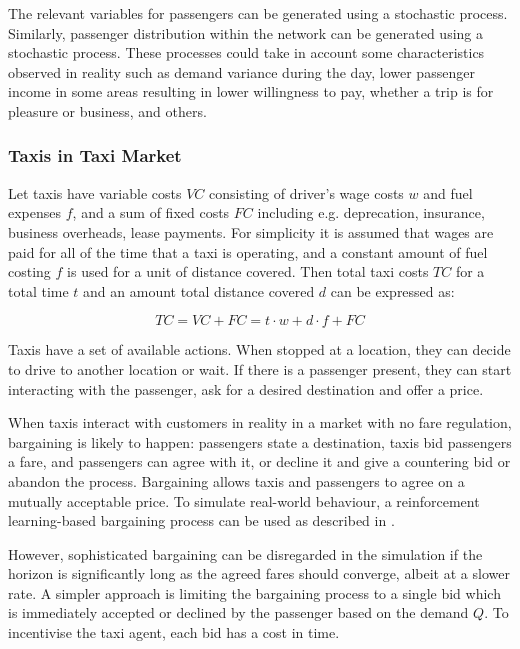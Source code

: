 The relevant variables for passengers can be generated using a stochastic
process. Similarly, passenger distribution within the network can be generated
using a stochastic process. These processes could take in account some
characteristics observed in reality such as demand variance during the day,
lower passenger income in some areas resulting in lower willingness to pay,
whether a trip is for pleasure or business, and others.


\subsubsection{Taxis in Taxi Market}
\label{sec:design:taxi}

Let taxis have variable costs \(VC\) consisting of driver's wage costs \(w\)
and fuel expenses \(f\), and a sum of fixed costs \(FC\) including e.g.
deprecation, insurance, business overheads, lease payments. For simplicity it
is assumed that wages are paid for all of the time that a taxi is operating,
and a constant amount of fuel costing \(f\) is used for a unit of distance
covered. Then total taxi costs \(TC\) for a total time \(t\) and an amount
total distance covered \(d\) can be expressed as:

\[ TC = VC + FC = t \cdot w + d \cdot f + FC \]

Taxis have a set of available actions. When stopped at a location, they can
decide to drive to another location or wait. If there is a passenger present,
they can start interacting with the passenger, ask for a desired destination
and offer a price.

When taxis interact with customers in reality in a market with no fare
regulation, bargaining is likely to happen: passengers state a destination,
taxis bid passengers a fare, and passengers can agree with it, or decline it
and give a countering bid or abandon the process. Bargaining allows taxis and
passengers to agree on a mutually acceptable price. To simulate real-world
behaviour, a reinforcement learning-based bargaining process can be used as
described in \textcite{Cli1997taxi+bargaining}.

However, sophisticated bargaining can be disregarded in the simulation if the
horizon is significantly long as the agreed fares should converge, albeit at a
slower rate. A simpler approach is limiting the bargaining process to a single
bid which is immediately accepted or declined by the passenger based on the
demand \(Q\). To incentivise the taxi agent, each bid has a cost in time.


